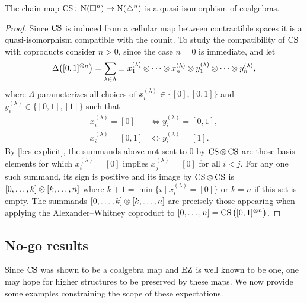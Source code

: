 \begin{lemma}
	The chain map $\operatorname{CS} \colon \operatorname{N}(\square^n) \to \operatorname{N}(\triangle^n)$ is a quasi-isomorphism of coalgebras.
\end{lemma}

\begin{proof}
	Since $\operatorname{CS}$ is induced from a cellular map between contractible spaces it is a quasi-isomorphism compatible with the counit.
	To study the compatibility of $\operatorname{CS}$ with coproducts consider $n > 0$, since the case $n = 0$ is immediate, and let
	\[
	\Delta \big( [0,1]^{\otimes n} \big) = \sum_{\lambda \in \Lambda} \pm \ x_1^{(\lambda)} \otimes \cdots \otimes x_n^{(\lambda)} \otimes y_1^{(\lambda)} \otimes \cdots \otimes y_n^{(\lambda)},
	\]
	where $\Lambda$ parameterizes all choices of $x_i^{(\lambda)} \in \{[0], [0,1]\}$ and $y_i^{(\lambda)} \in \{[0,1], [1]\}$ such that
	\begin{align*}
		x_i^{(\lambda)} = [0]   & \iff y_i^{(\lambda)} = [0,1], \\
		x_i^{(\lambda)} = [0,1] & \iff y_i^{(\lambda)} = [1].
	\end{align*}
	By \cref{l:cs explicit}, the summands above not sent to $0$ by $\operatorname{CS} \otimes \operatorname{CS}$ are those basis elements for which $x_i^{(\lambda)} = [0]$ implies $x_j^{(\lambda)} = [0]$ for all $i < j$.
	For any one such summand, its sign is positive and its image by $\operatorname{CS} \otimes \operatorname{CS}$ is $[0, \dots, k] \otimes [k, \dots, n]$ where $k+1 = \min \{i \mid x_i^{(\lambda)} = [0]\}$ or $k = n$ if this set is empty.
	The summands $[0, \dots, k] \otimes [k, \dots, n]$ are precisely those appearing when applying the Alexander--Whitney coproduct to $[0, \dots, n] = \operatorname{CS} \big( [0,1]^{\otimes n} \big)$.
\end{proof}

\subsection{No-go results}

Since $\operatorname{CS}$ was shown to be a coalgebra map and $\operatorname{EZ}$ is well known to be one, one may hope for higher structures to be preserved by these maps.
We now provide some examples constraining the scope of these expectations.

